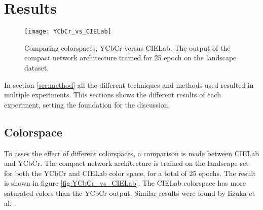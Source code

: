 \section{Results}\label{sec:results}
	\begin{wrapfigure}{R}{0.5\textwidth}
		\vspace{-15px}
		\centering
		\texttt{[image: YCbCr\_vs\_CIELab]}
		\caption{Comparing colorspaces, YCbCr versus CIELab. The output of the compact network architecture trained for 25 epoch on the landscape dataset.}
		\vspace{-40px}
	\end{wrapfigure}
In section \ref{sec:method} all the different techniques and methods used resulted in multiple experiments. This sections shows the different results of each experiment, setting the foundation for the discussion.

\subsection{Colorspace}
To asses the effect of different colorspaces, a comparison is made between CIELab and YCbCr. The compact network architecture is trained on the landscape set for both the YCbCr and CIELab color space, for a total of 25 epochs. The result is shown in figure \ref{fig:YCbCr_vs_CIELab}. The CIELab colorspace has more saturated colors than the YCbCr output. Similar results were found by Iizuka et al. \cite{IizukaSIGGRAPH2016}.

%		
%		

